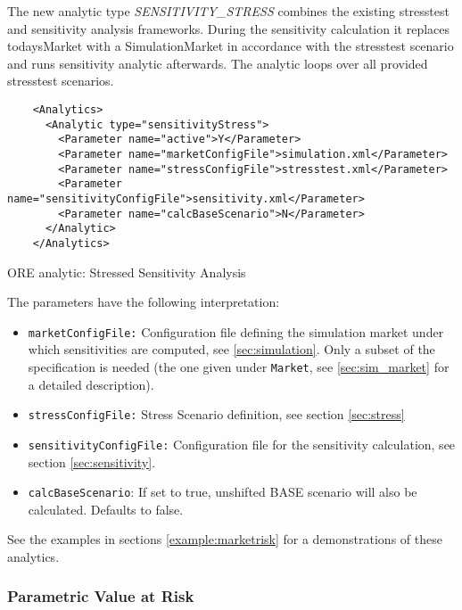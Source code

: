 {The new analytic type \emph{SENSITIVITY\_STRESS} combines the existing stresstest and sensitivity analysis frameworks. During the sensitivity calculation it replaces todaysMarket with a SimulationMarket in accordance with the stresstest scenario and runs sensitivity analytic afterwards. The analytic loops over all provided stresstest scenarios.

\begin{listing}[H]
  \begin{verbatim}
    <Analytics>
      <Analytic type="sensitivityStress">
        <Parameter name="active">Y</Parameter>
        <Parameter name="marketConfigFile">simulation.xml</Parameter>
        <Parameter name="stressConfigFile">stresstest.xml</Parameter>
        <Parameter name="sensitivityConfigFile">sensitivity.xml</Parameter>
        <Parameter name="calcBaseScenario">N</Parameter>
      </Analytic>
    </Analytics>
  \end{verbatim}
  \caption{ORE analytic: Stressed Sensitivity Analysis}
  \label{lst:ore_sensistress}
  \end{listing}

The parameters have the following interpretation:

\begin{itemize}
  \item {\tt marketConfigFile:} Configuration file defining the simulation market under which sensitivities are computed,
    see \ref{sec:simulation}. Only a subset of the specification is needed (the one given under {\tt Market}, see
    \ref{sec:sim_market} for a detailed description).
  \item {\tt stressConfigFile:} Stress Scenario definition, see section \ref{sec:stress}
  \item {\tt sensitivityConfigFile:} Configuration file  for the sensitivity calculation, see section \ref{sec:sensitivity}.
  \item {\tt calcBaseScenario}: If set to true, unshifted BASE scenario will also be calculated. Defaults to false.
\end{itemize}

See the examples in sections \ref{example:marketrisk} for a demonstrations of these analytics.

\subsubsection{Parametric Value at Risk}

}
